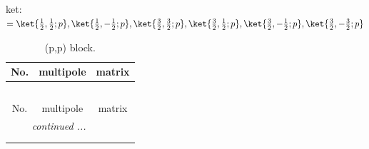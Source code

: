 \documentclass[fleqn,8pt,landscape]{jsarticle}
\begin{document}
\noindent
ket: $=\ket{\frac{1}{2},\frac{1}{2};p}, \ket{\frac{1}{2},- \frac{1}{2};p}, \ket{\frac{3}{2},\frac{3}{2};p}, \ket{\frac{3}{2},\frac{1}{2};p}, \ket{\frac{3}{2},- \frac{1}{2};p}, \ket{\frac{3}{2},- \frac{3}{2};p}$
\renewcommand{\arraystretch}{1.6}
\begin{longtable}{ccc}
\caption{(p,p) block.}
 \\
 \hline \hline
No. & multipole & matrix \\ \hline \endfirsthead

\multicolumn{2}{l}{\tablename\ \thetable{}} \\
 \hline \hline
No. & multipole & matrix \\ \hline \endhead

 \hline \hline
\multicolumn{2}{r}{\footnotesize\it continued ...} \\ \endfoot

 \hline \hline
\multicolumn{2}{r}{} \\ \endlastfoot


\end{longtable}
\end{document}
